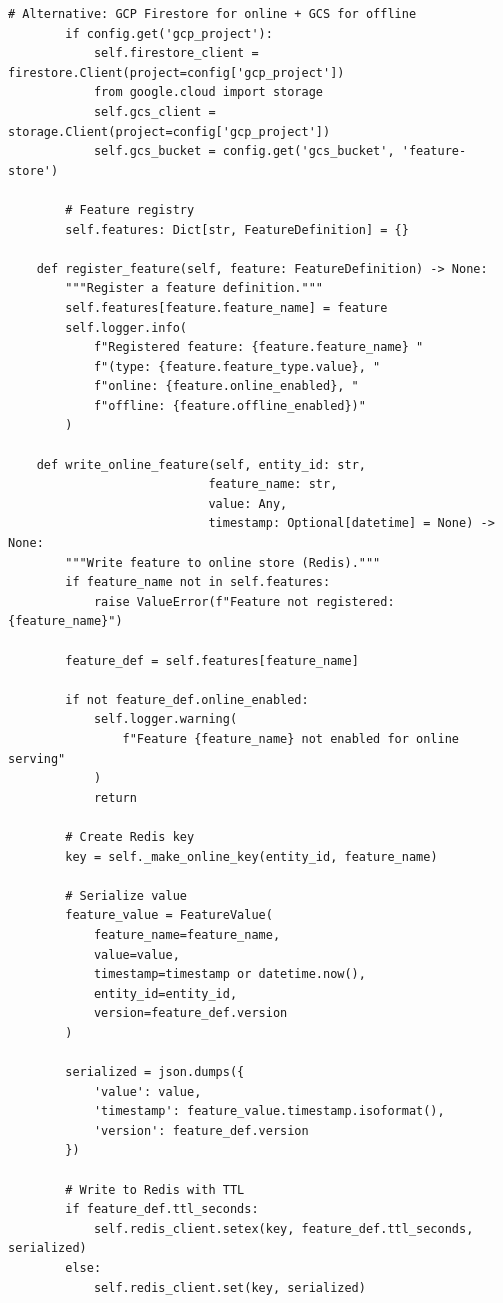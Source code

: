 \begin{lstlisting}[style=python, caption=FeatureStoreIntegrator with Dual Serving Modes]
        # Alternative: GCP Firestore for online + GCS for offline
        if config.get('gcp_project'):
            self.firestore_client = firestore.Client(project=config['gcp_project'])
            from google.cloud import storage
            self.gcs_client = storage.Client(project=config['gcp_project'])
            self.gcs_bucket = config.get('gcs_bucket', 'feature-store')

        # Feature registry
        self.features: Dict[str, FeatureDefinition] = {}

    def register_feature(self, feature: FeatureDefinition) -> None:
        """Register a feature definition."""
        self.features[feature.feature_name] = feature
        self.logger.info(
            f"Registered feature: {feature.feature_name} "
            f"(type: {feature.feature_type.value}, "
            f"online: {feature.online_enabled}, "
            f"offline: {feature.offline_enabled})"
        )

    def write_online_feature(self, entity_id: str,
                            feature_name: str,
                            value: Any,
                            timestamp: Optional[datetime] = None) -> None:
        """Write feature to online store (Redis)."""
        if feature_name not in self.features:
            raise ValueError(f"Feature not registered: {feature_name}")

        feature_def = self.features[feature_name]

        if not feature_def.online_enabled:
            self.logger.warning(
                f"Feature {feature_name} not enabled for online serving"
            )
            return

        # Create Redis key
        key = self._make_online_key(entity_id, feature_name)

        # Serialize value
        feature_value = FeatureValue(
            feature_name=feature_name,
            value=value,
            timestamp=timestamp or datetime.now(),
            entity_id=entity_id,
            version=feature_def.version
        )

        serialized = json.dumps({
            'value': value,
            'timestamp': feature_value.timestamp.isoformat(),
            'version': feature_def.version
        })

        # Write to Redis with TTL
        if feature_def.ttl_seconds:
            self.redis_client.setex(key, feature_def.ttl_seconds, serialized)
        else:
            self.redis_client.set(key, serialized)


\end{lstlisting}
